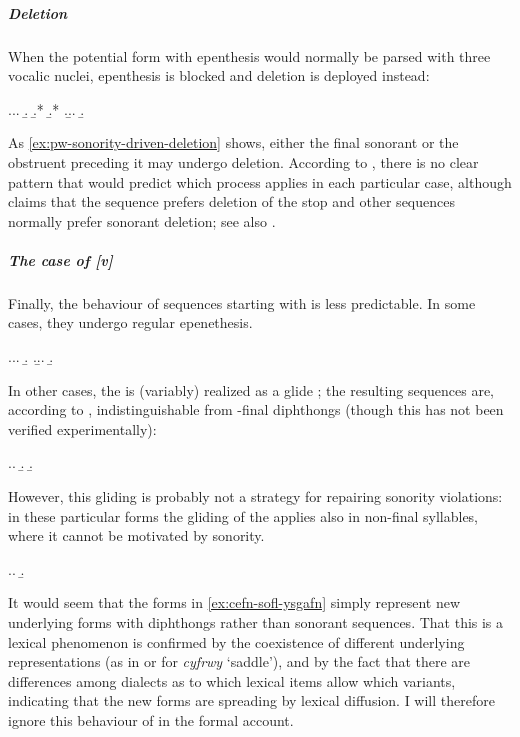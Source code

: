 \subparagraph{Deletion}
\label{sec:deletion}

When the potential form with epenthesis would normally be parsed with three vocalic nuclei, epenthesis is blocked and deletion is deployed instead:

\ex.\label{ex:pw-sonority-driven-deletion}\a.\a.
\b.
\b.*\mbi{[ˈfeːnestr]}
\b.*\mbi{[feˈnɛster]}
\z.\b.\a.
\b.

As \cref{ex:pw-sonority-driven-deletion} shows, either the final sonorant or the obstruent preceding it may undergo deletion. According to \citet{awbery86:_pembr_welsh}, there is no clear pattern that would predict which process applies in each particular case, although \citet[ch.~22]{wmffre03:_languag_wales} claims that the sequence \ipa{[dl]} prefers deletion of the stop and other sequences normally prefer sonorant deletion; see also \citet{russell84:_welsh,schrijver95:_studies_britis_celtic,thomas95:_un_fryth}.

\subparagraph{The case of [v]}
\label{sec:case-ipav}

Finally, the behaviour of sequences starting with \ipa{[v]} is less predictable. In some cases, they undergo regular epenethesis.

\ex.\a.\a.
\b.
\z.\b.\a.
\b.

In other cases, the \ipa{[v]} is (variably) realized as a glide \ipa{[w]}; the resulting sequences are, according to \citet[p.~95]{awbery86:_pembr_welsh}, indistinguishable from \ipa{[ʊ]}-final diphthongs (though this has not been verified experimentally):

\ex.\label{ex:cefn-sofl-ysgafn}\a.
\b.
\b.

However, this gliding is probably not a strategy for repairing sonority violations: in these particular forms the gliding of the \ipa{[v]} applies also in non-final syllables, where it cannot be motivated by sonority.

\ex.\a.
\b.

It would seem that the forms in \cref{ex:cefn-sofl-ysgafn} simply represent new underlying forms with diphthongs rather than \ipa{[v]}\endash sonorant sequences. That this is a lexical phenomenon is confirmed by the coexistence of different underlying representations (as in \ipa{[ˈkowru]} or \ipa{[ˈkəvru]} for \emph{cyfrwy} `saddle'), and by the fact that there are differences among dialects as to which lexical items allow which variants, indicating that the new forms are spreading by lexical diffusion. I will therefore ignore this behaviour of \ipa{[v]} in the formal account.

